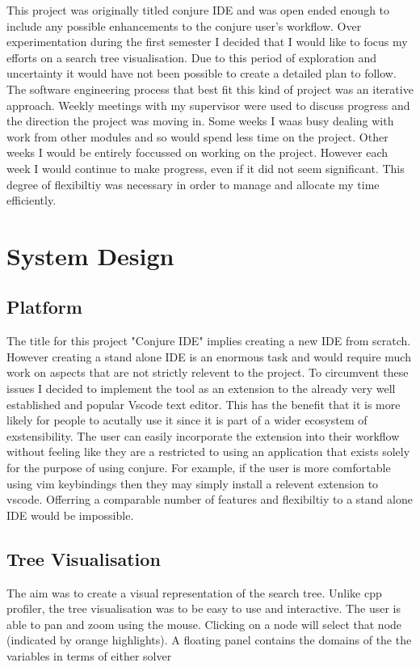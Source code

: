 \documentclass{article}
\begin{document}
This project was originally titled conjure IDE and was open ended enough to include any possible enhancements to the conjure user's workflow. Over experimentation during the first semester I decided that I would like to focus my efforts on a search tree visualisation. Due to this period of exploration and uncertainty it would have not been possible to create a detailed plan to follow. The software engineering process that best fit this kind of project was an iterative approach. Weekly meetings with my supervisor were used to discuss progress and the direction the project was moving in. Some weeks I waas busy dealing with work from other modules and so would spend less time on the project. Other weeks I would be entirely foccussed on working on the project. However each week I would continue to make progress, even if it did not seem significant. This degree of flexibiltiy was necessary in order to manage and allocate my time efficiently. 

\section{System Design}


\subsection{Platform}
The title for this project "Conjure IDE" implies creating a new IDE from scratch. However creating a stand alone IDE is an enormous task and would require much work on aspects that are not strictly relevent to the project. 
To circumvent these issues I decided to implement the tool as an extension to the already very well established and popular Vscode text editor. This has the benefit that it is more likely for people to acutally use it since it is part of a wider ecosystem of exstensibility. The user can easily incorporate the extension into their workflow without feeling like they are a restricted to using an application that exists solely for the purpose of using conjure. For example, if the user is more comfortable using vim keybindings then they may simply install a relevent extension to vscode. Offerring a comparable number of features and flexibiltiy to a stand alone IDE would be impossible.  


\subsection{Tree Visualisation}


The aim was to create a visual representation of the search tree. Unlike cpp profiler, the tree visualisation was to be easy to use and interactive. The user is able to pan and zoom using the mouse. Clicking on a node will select that node (indicated by orange highlights). A floating panel contains the domains of the the variables in terms of either solver 
\end{document}
